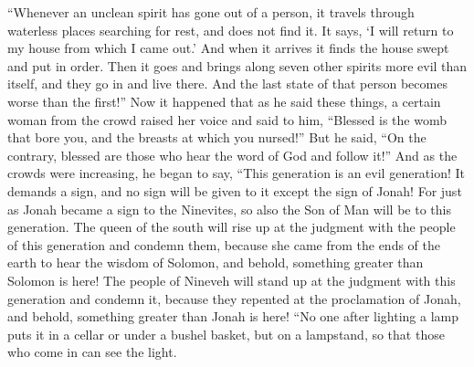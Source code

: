 \begin{biblechapter}
 “Whenever an unclean spirit has gone out of a person, it travels through waterless places searching for rest, and does not find it. It says, ‘I will return to my house from which I came out.’
\verse And when it arrives it finds the house swept and put in order.
\verse Then it goes and brings along seven other spirits more evil than itself, and they go in and live there. And the last state of that person becomes worse than the first!”
\verse Now it happened that as he said these things, a certain woman from the crowd raised her voice and said to him, “Blessed is the womb that bore you, and the breasts at which you nursed!”
\verse But he said, “On the contrary, blessed are those who hear the word of God and follow it!”
 And as the crowds were increasing, he began to say, “This generation is an evil generation! It demands a sign, and no sign will be given to it except the sign of Jonah!
\verse For just as Jonah became a sign to the Ninevites, so also the Son of Man will be to this generation.
\verse The queen of the south will rise up at the judgment with the people of this generation and condemn them, because she came from the ends of the earth to hear the wisdom of Solomon, and behold, something greater than Solomon is here!
\verse The people of Nineveh will stand up at the judgment with this generation and condemn it, because they repented at the proclamation of Jonah, and behold, something greater than Jonah is here!
 “No one after lighting a lamp puts it in a cellar or under a bushel basket, but on a lampstand, so that those who come in can see the light.

\end{biblechapter}
